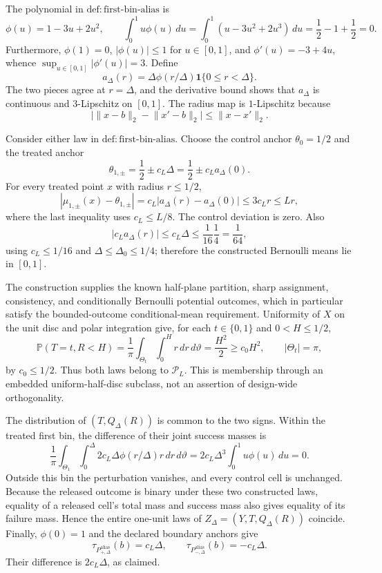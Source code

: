 The polynomial in \(\mathrm{def:first\text{-}bin\text{-}alias}\) is
\[
 \phi(u)=1-3u+2u^2,
 \qquad
 \int_0^1u\phi(u)\,du
 =\int_0^1(u-3u^2+2u^3)\,du
 =\frac12-1+\frac12=0.
\]
Furthermore, \(\phi(1)=0\), \(|\phi(u)|\leq1\) for \(u\in[0,1]\), and \(\phi'(u)=-3+4u\), whence \(\sup_{u\in[0,1]}|\phi'(u)|=3\).  Define
\[
 a_\Delta(r)=\Delta\phi(r/\Delta)\mathbf1\{0\leq r<\Delta\}.
\]
The two pieces agree at \(r=\Delta\), and the derivative bound shows that \(a_\Delta\) is continuous and \(3\)-Lipschitz on \([0,1]\).  The radius map is \(1\)-Lipschitz because
\[
 \bigl|\lVert x-b\rVert_2-\lVert x'-b\rVert_2\bigr|
 \leq\lVert x-x'\rVert_2.
\]

Consider either law in \(\mathrm{def:first\text{-}bin\text{-}alias}\).  Choose the control anchor \(\theta_0=1/2\) and the treated anchor
\[
 \theta_{1,\pm}=\frac12\pm c_L\Delta
 =\frac12\pm c_La_\Delta(0).
\]
For every treated point \(x\) with radius \(r\leq1/2\),
\[
 |\mu_{1,\pm}(x)-\theta_{1,\pm}|
 =c_L|a_\Delta(r)-a_\Delta(0)|
 \leq3c_Lr\leq Lr,
\]
where the last inequality uses \(c_L\leq L/8\).  The control deviation is zero.  Also
\[
 |c_La_\Delta(r)|\leq c_L\Delta
 \leq\frac1{16}\frac14=\frac1{64},
\]
using \(c_L\leq1/16\) and \(\Delta\leq\Delta_0\leq1/4\); therefore the constructed Bernoulli means lie in \([0,1]\).

The construction supplies the known half-plane partition, sharp assignment, consistency, and conditionally Bernoulli potential outcomes, which in particular satisfy the bounded-outcome conditional-mean requirement.  Uniformity of \(X\) on the unit disc and polar integration give, for each \(t\in\{0,1\}\) and \(0<H\leq1/2\),
\[
 \mathbb P(T=t,R<H)
 =\frac1\pi\int_{\Theta_t}\int_0^H r\,dr\,d\vartheta
 =\frac{H^2}{2}
 \geq c_0H^2,
 \qquad |\Theta_t|=\pi,
\]
by \(c_0\leq1/2\).  Thus both laws belong to \(\mathcal P_L\).  This is membership through an embedded uniform-half-disc subclass, not an assertion of design-wide orthogonality.

The distribution of \((T,Q_\Delta(R))\) is common to the two signs.  Within the treated first bin, the difference of their joint success masses is
\[
 \frac1\pi\int_{\Theta_1}\int_0^\Delta
 2c_L\Delta\phi(r/\Delta)r\,dr\,d\vartheta
 =2c_L\Delta^3\int_0^1u\phi(u)\,du=0.
\]
Outside this bin the perturbation vanishes, and every control cell is unchanged.  Because the released outcome is binary under these two constructed laws, equality of a released cell's total mass and success mass also gives equality of its failure mass.  Hence the entire one-unit laws of \(Z_\Delta=(Y,T,Q_\Delta(R))\) coincide.  Finally, \(\phi(0)=1\) and the declared boundary anchors give
\[
 \tau_{P^{\mathrm{alias}}_{+,\Delta}}(b)=c_L\Delta,
 \qquad
 \tau_{P^{\mathrm{alias}}_{-,\Delta}}(b)=-c_L\Delta.
\]
Their difference is \(2c_L\Delta\), as claimed.